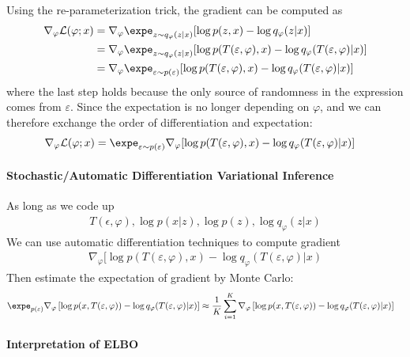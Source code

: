 \documentclass{article}
\begin{document}
	Using the re-parameterization trick, the gradient can be computed as
	\begin{align}
		\nabla_\varphi \mc{L}(\varphi; x)
		&= \nabla_\varphi \expe_{z \sim q_\varphi(z|x)} [\log p(z, x) - \log q_\varphi(z|x)] \\
		&= \nabla_\varphi \expe_{z \sim q_\varphi(z|x)} [\log p(T(\varepsilon, \varphi), x) - \log q_\varphi(T(\varepsilon, \varphi)|x)] \\
		&= \nabla_\varphi \expe_{\varepsilon \sim p(\varepsilon)} [\log p(T(\varepsilon, \varphi), x) - \log q_\varphi(T(\varepsilon, \varphi)|x)]
	\end{align}
	where the last step holds because the only source of randomness in the expression comes from $\varepsilon$. Since the expectation is no longer depending on $\varphi$, and we can therefore exchange the order of differentiation and expectation:
	\begin{align}
		\nabla_\varphi \mc{L}(\varphi; x)
		&= \expe_{\varepsilon \sim p(\varepsilon)} \nabla_\varphi [\log p(T(\varepsilon, \varphi), x) - \log q_\varphi(T(\varepsilon, \varphi)|x)]
	\end{align}
	
	\paragraph{Stochastic/Automatic Differentiation Variational Inference} As long as we code up
	\begin{align}
		T(\epsilon, \varphi), \log p(x|z), \log p(z), \log q_\varphi (z|x)
	\end{align}
	We can use automatic differentiation techniques to compute gradient
	\begin{align}
		\nabla_\varphi [\log p(T(\varepsilon, \varphi), x) - \log q_\varphi(T(\varepsilon, \varphi)|x)
	\end{align}
	Then estimate the expectation of gradient by Monte Carlo:
	\begin{align}
		\expe_{p(\varepsilon)} \nabla_\varphi \left[
		\log p(x,T(\varepsilon , \varphi)) - \log q_\varphi (T(\varepsilon, \varphi)|x)
		\right] 
		&\approx \frac{1}{K} \sum_{i=1}^K \nabla_\varphi \left[
		\log p(x,T(\varepsilon , \varphi)) - \log q_\varphi (T(\varepsilon, \varphi)|x)
		\right]
	\end{align}
	
	\paragraph{Interpretation of ELBO}
	
\end{document}
